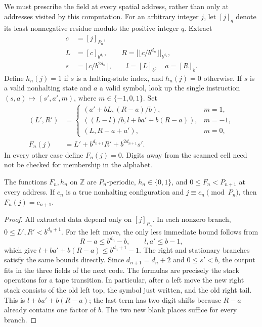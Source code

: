 We must prescribe the field at every spatial address, rather than only
at addresses visited by this computation.  For an arbitrary integer
$j$, let $[j]_q$ denote its least nonnegative residue modulo the positive
integer $q$.  Extract
\[
 \begin{split}
 c&=[j]_{P_n},\\
 L&=[c]_{b^{d_n}},\qquad
 R=\bigl[\lfloor c/b^{d_n}\rfloor\bigr]_{b^{d_n}},\\
 s&=\lfloor c/b^{2d_n}\rfloor,\qquad
 l=[L]_b,\quad a=[R]_b.
 \end{split}
\]
Define $h_n(j)=1$ if $s$ is a halting-state index, and $h_n(j)=0$
otherwise.  If $s$ is a valid nonhalting state and $a$ a valid symbol,
look up the single instruction $(s,a)\mapsto(s',a',m)$, where
$m\in\{-1,0,1\}$.  Set
\begin{equation}\label{eq:lattice-transition}
 \begin{split}
 (L',R')&=
 \begin{cases}
 (a'+bL,(R-a)/b),&m=1,\\
 ((L-l)/b,l+ba'+b(R-a)),&m=-1,\\
 (L,R-a+a'),&m=0,
 \end{cases}\\
 F_n(j)&=L'+b^{d_{n+1}}R'+b^{2d_{n+1}}s'.
 \end{split}
\end{equation}
In every other case define $F_n(j)=0$.  Digits away from the scanned
cell need not be checked for membership in the alphabet.

\begin{lemma}\label{lem:lattice-address}
The functions $F_n,h_n$ on $\mathbb Z$ are $P_n$-periodic,
$h_n\in\{0,1\}$, and $0\le F_n<P_{n+1}$ at every address.
If $c_n$ is a true nonhalting configuration and
$j\equiv c_n\pmod {P_n}$, then $F_n(j)=c_{n+1}$.
\end{lemma}
\begin{proof}
All extracted data depend only on $[j]_{P_n}$.  In each nonzero branch,
$0\le L',R'<b^{d_n+1}$.  For the left move, the only less immediate
bound follows from
\[
 R-a\le b^{d_n}-b,\qquad l,a'\le b-1,
\]
which give $l+ba'+b(R-a)\le b^{d_n+1}-1$.  The right and stationary
branches satisfy the same bounds directly.  Since $d_{n+1}=d_n+2$
and $0\le s'<b$, the output fits in the three fields of the next code.
The formulas are precisely the stack operations for a tape transition.
In particular, after a left move the new right stack consists of the
old left top, the symbol just written, and the old right tail.  This is
$l+ba'+b(R-a)$; the last term has two digit shifts because $R-a$
already contains one factor of $b$.  The two new blank places suffice
for every branch.
\end{proof}

